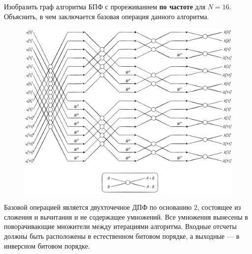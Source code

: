 \protect\thispagestyle{fancy}
\section{}
Изобразить граф алгоритма БПФ с прореживанием \textbf{по частоте} для $N=16$. 
Объяснить, в чем заключается базовая операция данного алгоритма.

\begin{figure}[!h]
	\centering
	\includegraphics[width=1.\columnwidth]{pics/spring/3/1.png}
	\label{fig:3-1}
\end{figure}

Базовой операцией является двухточечное ДПФ по основанию $2$, состоящее из сложения и вычитания и не содержащее умножений. Все умножения вынесены в поворачивающие множители между итерациями алгоритма. Входные отсчеты должны быть расположены в естественном битовом порядке, а выходные --- в инверсном битовом порядке.

\newpage
